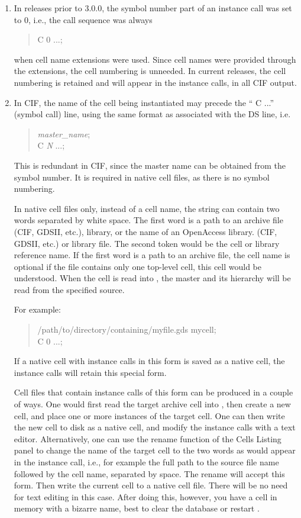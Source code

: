 \begin{enumerate}
\item In {\Xic} releases prior to 3.0.0, the symbol number part of
an instance call was set to 0, i.e., the call sequence was always
\begin{quote}
{\vt C 0} ...{\vt ;}
\end{quote}
when cell name extensions were used.  Since cell names were provided
through the extensions, the cell numbering is unneeded.  In current
releases, the cell numbering is retained and will appear in the
instance calls, in all CIF output.

\item In CIF, the name of the cell being instantiated may precede the ``{\vt
C ...}'' (symbol call) line, using the same format as associated with
the {\vt DS} line, i.e.
\begin{quote}
{} {\it master\_name\/}{\vt ;}\\
{\vt C} {\it N} {\vt ...;}
\end{quote}
This is redundant in CIF, since the master name can be obtained from
the symbol number.  It is required in native cell files, as there is
no symbol numbering.

In native cell files only, instead of a cell name, the string can
contain two words separated by white space.  The first word is a path
to an archive
\ifoa
file (CIF, GDSII, etc.), library, or the name of an
OpenAccess library.
\else
(CIF, GDSII, etc.) or library file.
\fi
The second token would be the cell or library reference name.  If the
first word is a path to an archive file, the cell name is optional if
the file contains only one top-level cell, this cell would be
understood.  When the cell is read into {\Xic}, the master and its
hierarchy will be read from the specified source.

For example:
\begin{quote}
{ /path/to/directory/containing/myfile.gds mycell;}\\
{\vt C 0 ...;}\\
\end{quote}

If a native cell with instance calls in this form is saved as a native
cell, the instance calls will retain this special form.

Cell files that contain instance calls of this form can be produced in
a couple of ways.  One would first read the target archive cell into
{\Xic}, then create a new cell, and place one or more instances of the
target cell.  One can then write the new cell to disk as a native
cell, and modify the instance calls with a text editor. 
Alternatively, one can use the rename function of the {\cb Cells
Listing} panel to change the name of the target cell to the two words
as would appear in the instance call, i.e., for example the full path
to the source file name followed by the cell name, separated by space. 
The rename will accept this form.  Then write the current cell to a
native cell file.  There will be no need for text editing in this
case.  After doing this, however, you have a cell in memory with a
bizarre name, best to clear the database or restart {\Xic}.


\end{enumerate}
